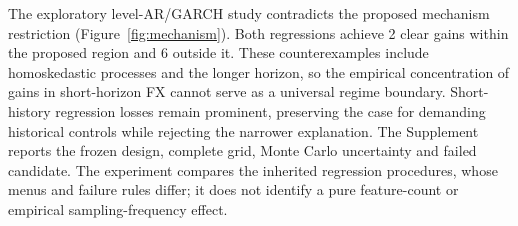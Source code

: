 The exploratory level-AR/GARCH study contradicts the proposed mechanism restriction (Figure~\ref{fig:mechanism}). Both regressions achieve 2 clear gains within the proposed region and 6 outside it. These counterexamples include homoskedastic processes and the longer horizon, so the empirical concentration of gains in short-horizon FX cannot serve as a universal regime boundary. Short-history regression losses remain prominent, preserving the case for demanding historical controls while rejecting the narrower explanation. The Supplement reports the frozen design, complete grid, Monte Carlo uncertainty and failed candidate. The experiment compares the inherited regression procedures, whose menus and failure rules differ; it does not identify a pure feature-count or empirical sampling-frequency effect.
